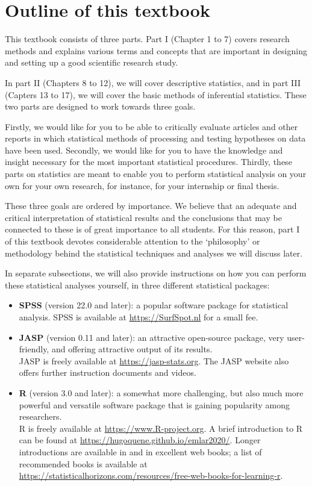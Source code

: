 \documentclass[
]{book}
\begin{document}
\hypertarget{sec:intro-outline}{%
\section{Outline of this textbook}\label{sec:intro-outline}}

This textbook consists of three parts. Part I (Chapter 1 to 7) covers research methods and explains various terms and concepts that are important in designing and setting up a good scientific research study.

In part II (Chapters 8 to 12), we will cover descriptive statistics, and in part III (Capters 13 to 17), we will cover the basic methods of inferential statistics. These two parts are designed to work towards three goals.

Firstly, we would like for you to be able to critically evaluate articles and other reports in which statistical methods of processing and testing hypotheses on data have been used.
Secondly, we would like for you to have the knowledge and insight necessary for the most important statistical procedures. Thirdly, these parts on statistics are meant to enable you to perform statistical analysis on your own for your own research, for instance, for your internship or final thesis.

These three goals are ordered by importance. We believe that an adequate and critical interpretation of statistical results and the conclusions that may be connected to these is of great importance to all students. For this reason, part I of this textbook devotes considerable attention to the `philosophy' or methodology behind the statistical techniques and analyses we will discuss later.

In separate subsections, we will also provide instructions on how you can perform these statistical analyses yourself, in three different statistical packages:

\begin{itemize}
\item
  \textbf{SPSS} (version 22.0 and later): a popular software package for statistical analysis.
  SPSS is available at \url{https://SurfSpot.nl} for a small fee.
\item
  \textbf{JASP} (version 0.11 and later): an attractive open-source package, very user-friendly, and offering attractive output of its results.\\
  JASP is freely available at \url{https://jasp-stats.org}. The JASP website also offers further instruction documents and videos.
\item
  \textbf{R} (version 3.0 and later): a somewhat more challenging, but also much more powerful and versatile software package that is gaining popularity among researchers.\\
  R is freely available at \url{https://www.R-project.org}.
  A brief introduction to R can be found at \url{https://hugoquene.github.io/emlar2020/}.
  Longer introductions are available in \citet{Dalg02} and in excellent web books; a list of recommended books is available at \url{https://statisticalhorizons.com/resources/free-web-books-for-learning-r}.
\end{itemize}
\end{document}
